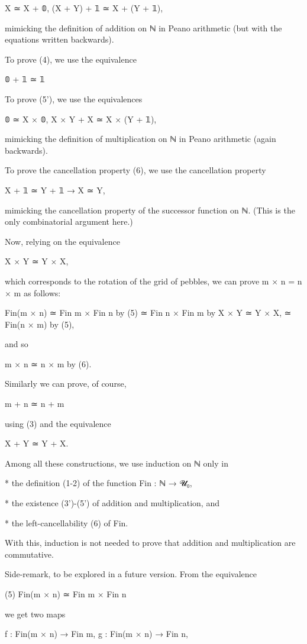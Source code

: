  X ≃ X + 𝟘,
 (X + Y) + 𝟙 ≃ X + (Y + 𝟙),

mimicking the definition of addition on ℕ in Peano arithmetic (but
with the equations written backwards).

To prove (4), we use the equivalence

 𝟘 + 𝟙 ≃ 𝟙

To prove (5'), we use the equivalences

 𝟘 ≃ X × 𝟘,
 X × Y + X ≃ X × (Y + 𝟙),

mimicking the definition of multiplication on ℕ in Peano arithmetic
(again backwards).

To prove the cancellation property (6), we use the cancellation
property

 X + 𝟙 ≃ Y + 𝟙 → X ≃ Y,

mimicking the cancellation property of the successor function on ℕ.
(This is the only combinatorial argument here.)

Now, relying on the equivalence

 X × Y ≃ Y × X,

which corresponds to the rotation of the grid of pebbles, we can prove
m × n = n × m as follows:

 Fin(m × n) ≃ Fin m × Fin n   by (5)
            ≃ Fin n × Fin m   by  X × Y ≃ Y × X,
            ≃ Fin(n × m)      by (5),

and so

 m × n ≃ n × m                by (6).

Similarly we can prove, of course,

 m + n ≃ n + m

using (3) and the equivalence

 X + Y ≃ Y + X.

Among all these constructions, we use induction on ℕ only in

  * the definition (1-2) of the function Fin : ℕ → 𝓤₀,

  * the existence (3')-(5') of addition and multiplication, and

  * the left-cancellability (6) of Fin.

With this, induction is not needed to prove that addition and
multiplication are commutative.

Side-remark, to be explored in a future version. From the equivalence

 (5) Fin(m × n) ≃ Fin m × Fin n

we get two maps

     f : Fin(m × n) → Fin m,
     g : Fin(m × n) → Fin n,


